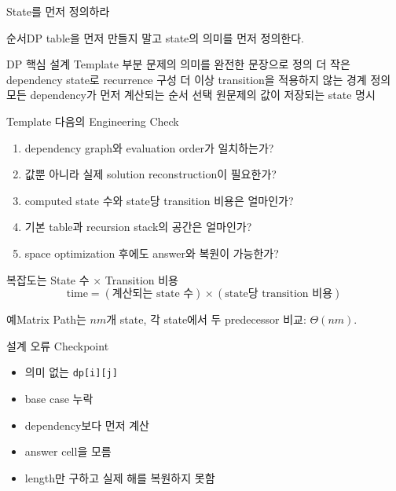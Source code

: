 \begin{frame}{State를 먼저 정의하라}
\begin{alertblock}{순서}DP table을 먼저 만들지 말고 state의 의미를 먼저 정의한다.\end{alertblock}
\end{frame}
\begin{frame}{DP 핵심 설계 Template}
\small
\dpdesign
{부분 문제의 의미를 완전한 문장으로 정의}
{더 작은 dependency state로 recurrence 구성}
{더 이상 transition을 적용하지 않는 경계 정의}
{모든 dependency가 먼저 계산되는 순서 선택}
{원문제의 값이 저장되는 state 명시}
\end{frame}
\begin{frame}{Template 다음의 Engineering Check}
\begin{enumerate}
\item dependency graph와 evaluation order가 일치하는가?
\item 값뿐 아니라 실제 solution reconstruction이 필요한가?
\item computed state 수와 state당 transition 비용은 얼마인가?
\item 기본 table과 recursion stack의 공간은 얼마인가?
\item space optimization 후에도 answer와 복원이 가능한가?
\end{enumerate}
\end{frame}
\begin{frame}{복잡도는 State 수 × Transition 비용}
\[
\text{time}=(\text{계산되는 state 수})\times(\text{state당 transition 비용})
\]
\begin{exampleblock}{예}Matrix Path는 $nm$개 state, 각 state에서 두 predecessor 비교: $\Theta(nm)$.\end{exampleblock}
\end{frame}
\begin{frame}{설계 오류 Checkpoint}
\begin{itemize}\item 의미 없는 \texttt{dp[i][j]}\item base case 누락\item dependency보다 먼저 계산\item answer cell을 모름\item length만 구하고 실제 해를 복원하지 못함\end{itemize}
\vfill{}
\end{frame}
